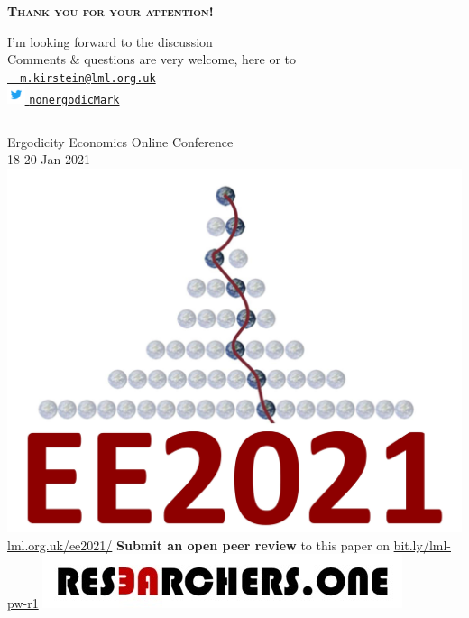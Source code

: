 \begin{frame}

\centering
\vspace{2em}

{\Large \textsc{\textbf{Thank you for your attention!}}}\\

\vspace{2em}

I'm looking forward to the discussion\\
Comments \& questions are very welcome, here or to\\
\vspace{.5em}
\texttt{\href{mailto: m.kirstein@lml.org.uk}{\Letter ~ m.kirstein@lml.org.uk}}\\

\href{https://twitter.com/nonergodicMark}{\includegraphics[height=1.4em,valign=c]{img/Twitter_Logo_Blue} \MVAt \texttt{nonergodicMark}}

\vspace{2em}

\begin{columns}[T]
	Ergodicity Economics Online Conference \\
	18-20 Jan 2021 \\
	\centering \includegraphics[width=.5\textwidth]{img/EE2021logo-scaled}\\
	\url{lml.org.uk/ee2021/}
	\textbf{Submit an open peer review} to this paper on \url{bit.ly/lml-pw-r1} 
	\includegraphics[width=.9\textwidth]{img/resone-logo} \\
\end{columns}

\end{frame}